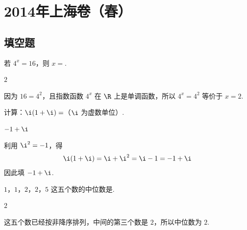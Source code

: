 
\chapter{2014年上海卷（春）}

\section{填空题}

\begin{problem}
若 \( 4^{x}=16 \)，则 \(x=\)\fillinblank{}.
\end{problem}

\begin{answer}
\(2\)
\end{answer}

\begin{solution}
因为 \(16=4^2\)，且指数函数 \(4^x\) 在 \(\R\) 上是单调函数，所以 \(4^x=4^2\) 等价于 \(x=2\).
\end{solution}

\begin{problem}
计算：\(\i(1+\i)=\)\fillinblank{}（\(\i\) 为虚数单位）.
\end{problem}

\begin{answer}
\(-1+\i\)
\end{answer}

\begin{solution}
利用 \(\i^2=-1\)，得
\[
\i(1+\i)=\i+\i^2=\i-1=-1+\i
\]
因此填 \(-1+\i\).
\end{solution}

\begin{problem}
\(1\)，\(1\)，\(2\)，\(2\)，\(5\) 这五个数的中位数是\fillinblank{}.
\end{problem}

\begin{answer}
\(2\)
\end{answer}

\begin{solution}
这五个数已经按非降序排列，中间的第三个数是 \(2\)，所以中位数为 \(2\).
\end{solution}

